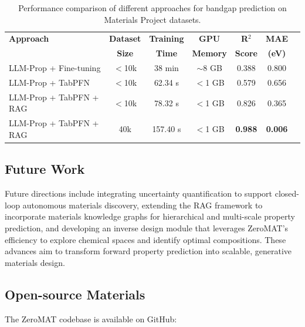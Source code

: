 \begin{table}[h]
\centering
\small
\caption{Performance comparison of different approaches for bandgap prediction on Materials Project datasets.}
\label{tab:ZeroMAT}
\begin{tabular}{lcccccc}
\toprule
\textbf{Approach} & \textbf{Dataset} & \textbf{Training} & \textbf{GPU} & \textbf{R$^2$} & \textbf{MAE} \\
 & \textbf{Size} & \textbf{Time} & \textbf{Memory} & \textbf{Score} & \textbf{(eV)} \\
\midrule
LLM-Prop + Fine-tuning & $<$10k & 38 min & $\sim$8 GB & 0.388 & 0.800 \\
LLM-Prop + TabPFN & $<$10k & 62.34 s & $<$1 GB & 0.579 & 0.656 \\
LLM-Prop + TabPFN + RAG & $<$10k & 78.32 s & $<$1 GB & 0.826 & 0.365 \\
LLM-Prop + TabPFN + RAG & 40k & 157.40 s & $<$1 GB & \textbf{0.988} & \textbf{0.006} \\
\bottomrule
\end{tabular}
\end{table}

\subsection*{Future Work}
Future directions include integrating uncertainty quantification to support closed-loop autonomous materials discovery, extending the RAG framework to incorporate materials knowledge graphs for hierarchical and multi-scale property prediction, and developing an inverse design module that leverages ZeroMAT’s efficiency to explore chemical spaces and identify optimal compositions. These advances aim to transform forward property prediction into scalable, generative materials design.

\subsection*{Open-source Materials}
The ZeroMAT codebase is available on GitHub: 


